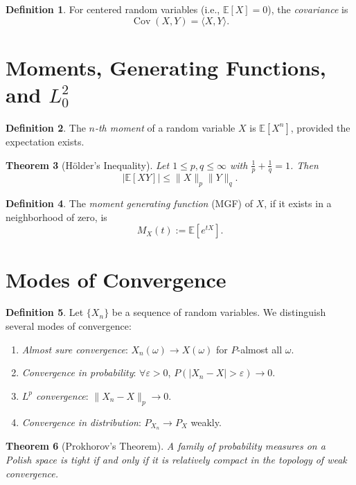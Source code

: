 \documentclass[11pt,reqno]{amsart}
\newtheorem{theorem}{Theorem}[section]
\theoremstyle{definition}
\newtheorem{definition}[theorem]{Definition}
\theoremstyle{remark}
\begin{document}
\begin{definition}
	For centered random variables (i.e., $\mathbb{E}[X]=0$), the \emph{covariance} is
	\[
		\operatorname{Cov}(X, Y) = \langle X, Y \rangle.
	\]
\end{definition}

\section{Moments, Generating Functions, and \(L^2_0\)}

\begin{definition}
	The \emph{$n$-th moment} of a random variable $X$ is $\mathbb{E}[X^n]$, provided the expectation exists.
\end{definition}

\begin{theorem}[Hölder's Inequality]
	Let $1 \leq p, q \leq \infty$ with $\frac{1}{p} + \frac{1}{q} = 1$. Then
	\[
		|\mathbb{E}[XY]| \leq \|X\|_p \|Y\|_q.
	\]
\end{theorem}

\begin{definition}
	The \emph{moment generating function} (MGF) of $X$, if it exists in a neighborhood of zero, is
	\[
		M_X(t) := \mathbb{E}[e^{tX}].
	\]
\end{definition}

\section{Modes of Convergence}

\begin{definition}
	Let $\{X_n\}$ be a sequence of random variables. We distinguish several modes of convergence:
	\begin{enumerate}[label=(\roman*)]
		\item \emph{Almost sure convergence}: $X_n(\omega) \to X(\omega)$ for $P$-almost all $\omega$.
		\item \emph{Convergence in probability}: $\forall \varepsilon>0$, $P(|X_n - X| > \varepsilon) \to 0$.
		\item \emph{$L^p$ convergence}: $\|X_n - X\|_p \to 0$.
		\item \emph{Convergence in distribution}: $P_{X_n} \to P_X$ weakly.
	\end{enumerate}
\end{definition}

\begin{theorem}[Prokhorov's Theorem]
	A family of probability measures on a Polish space is tight if and only if it is relatively compact in the topology of weak convergence.
\end{theorem}
\end{document}
